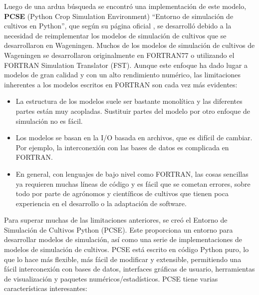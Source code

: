 Luego de una ardua búsqueda se encontró una implementación de este modelo, \textbf{PCSE} (Python Crop Simulation Environment)  “Entorno de simulación de cultivos en Python”, que según su página oficial \parencite{wofost_oficial_page} , se desarrolló debido a la necesidad de reimplementar los modelos de simulación de cultivos que se desarrollaron en Wageningen. Muchos de los modelos de simulación de cultivos de Wageningen se desarrollaron originalmente en FORTRAN77 o utilizando el FORTRAN Simulation Translator (FST). Aunque este enfoque ha dado lugar a modelos de gran calidad y con un alto rendimiento numérico, las limitaciones inherentes a los modelos escritos en FORTRAN son cada vez más evidentes:
\begin{itemize}
	\item La estructura de los modelos suele ser bastante monolítica y las diferentes partes están muy acopladas. Sustituir partes del modelo por otro enfoque de simulación no es fácil.
	\item Los modelos se basan en la I/O basada en archivos, que es difícil de cambiar. Por ejemplo, la interconexión con las bases de datos es complicada en FORTRAN.
	\item En general, con lenguajes de bajo nivel como FORTRAN, las cosas sencillas ya requieren muchas líneas de código y es fácil que se cometan errores, sobre todo por parte de agrónomos y científicos de cultivos que tienen poca experiencia en el desarrollo o la adaptación de software.
\end{itemize}

Para superar muchas de las limitaciones anteriores, se creó el Entorno de Simulación de Cultivos Python (PCSE). Este proporciona un entorno para desarrollar modelos de simulación, así como una serie de implementaciones de modelos de simulación de cultivos. PCSE está escrito en código Python puro, lo que lo hace más flexible, más fácil de modificar y extensible, permitiendo una fácil interconexión con bases de datos, interfaces gráficas de usuario, herramientas de visualización y paquetes numéricos/estadísticos. PCSE tiene varias características interesantes:

